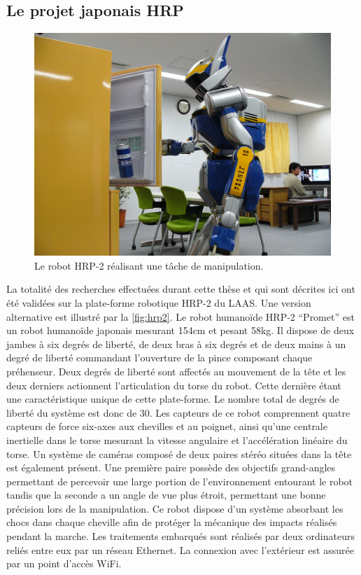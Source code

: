 \subsection{Le projet japonais HRP}


\begin{figure}
  \begin{center}
    \includegraphics[width=\linewidth]{src/chap0-introduction/hrp2.jpg}
  \end{center}
  \caption{Le robot HRP-2 réalisant une tâche de
    manipulation. \label{fig:hrp2}}
\end{figure}


La totalité des recherches effectuées durant cette thèse et qui sont
décrites ici ont été validées sur la plate-forme robotique HRP-2
\citep{04kaneko.icra} du LAAS. Une version alternative est illustré
par la \autoref{fig:hrp2}. Le robot humanoïde HRP-2 ``Promet'' est un
robot humanoïde japonais mesurant 154cm et pesant 58kg. Il dispose de
deux jambes à six degrés de liberté, de deux bras à six degrés et de
deux mains à un degré de liberté commandant l'ouverture de la pince
composant chaque préhenseur. Deux degrés de liberté sont affectés au
mouvement de la tête et les deux derniers actionnent l'articulation du
torse du robot. Cette dernière étant une caractéristique unique de
cette plate-forme. Le nombre total de degrés de liberté du système est
donc de 30. Les capteurs de ce robot comprennent quatre capteurs de
force six-axes aux chevilles et au poignet, ainsi qu'une centrale
inertielle dans le torse mesurant la vitesse angulaire et
l'accélération linéaire du torse. Un système de caméras composé de
deux paires stéréo situées dans la tête est également présent. Une
première paire possède des objectifs grand-angles permettant de
percevoir une large portion de l'environnement entourant le robot
tandis que la seconde a un angle de vue plus étroit, permettant une
bonne précision lors de la manipulation. Ce robot dispose d'un système
absorbant les chocs dans chaque cheville afin de protéger la mécanique
des impacts réalisés pendant la marche. Les traitements embarqués sont
réalisés par deux ordinateurs reliés entre eux par un réseau
Ethernet. La connexion avec l'extérieur est assurée par un point
d'accès WiFi.


